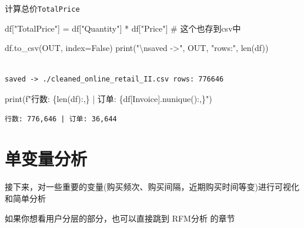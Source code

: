 \documentclass[
]{ctexart}
\newenvironment{Shaded}{\begin{snugshade}}{\end{snugshade}}
\newcommand{\BuiltInTok}[1]{\textcolor[rgb]{0.00,0.23,0.31}{#1}}
\newcommand{\CharTok}[1]{\textcolor[rgb]{0.13,0.47,0.30}{#1}}
\newcommand{\CommentTok}[1]{\textcolor[rgb]{0.37,0.37,0.37}{#1}}
\newcommand{\NormalTok}[1]{\textcolor[rgb]{0.00,0.23,0.31}{#1}}
\newcommand{\OperatorTok}[1]{\textcolor[rgb]{0.37,0.37,0.37}{#1}}
\newcommand{\SpecialCharTok}[1]{\textcolor[rgb]{0.37,0.37,0.37}{#1}}
\newcommand{\SpecialStringTok}[1]{\textcolor[rgb]{0.13,0.47,0.30}{#1}}
\newcommand{\StringTok}[1]{\textcolor[rgb]{0.13,0.47,0.30}{#1}}
\newcommand{\VariableTok}[1]{\textcolor[rgb]{0.07,0.07,0.07}{#1}}
\begin{document}
计算总价\texttt{TotalPrice}

\begin{Shaded}
\begin{Highlighting}[]
\NormalTok{df[}\StringTok{"TotalPrice"}\NormalTok{] }\OperatorTok{=}\NormalTok{ df[}\StringTok{"Quantity"}\NormalTok{] }\OperatorTok{*}\NormalTok{ df[}\StringTok{"Price"}\NormalTok{] }\CommentTok{\# 这个也存到csv中}
\end{Highlighting}
\end{Shaded}

\begin{Shaded}
\begin{Highlighting}[]
\NormalTok{df.to\_csv(OUT, index}\OperatorTok{=}\VariableTok{False}\NormalTok{)}
\BuiltInTok{print}\NormalTok{(}\StringTok{"}\CharTok{\textbackslash{}n}\StringTok{saved {-}\textgreater{}"}\NormalTok{, OUT, }\StringTok{"rows:"}\NormalTok{, }\BuiltInTok{len}\NormalTok{(df))}
\end{Highlighting}
\end{Shaded}

\begin{verbatim}

saved -> ./cleaned_online_retail_II.csv rows: 776646
\end{verbatim}

\begin{Shaded}
\begin{Highlighting}[]
\BuiltInTok{print}\NormalTok{(}\SpecialStringTok{f"行数: }\SpecialCharTok{\{}\BuiltInTok{len}\NormalTok{(df)}\SpecialCharTok{:,\}}\SpecialStringTok{ | 订单: }\SpecialCharTok{\{}\NormalTok{df[}\StringTok{\textquotesingle{}Invoice\textquotesingle{}}\NormalTok{]}\SpecialCharTok{.}\NormalTok{nunique()}\SpecialCharTok{:,\}}\SpecialStringTok{"}\NormalTok{)}
\end{Highlighting}
\end{Shaded}

\begin{verbatim}
行数: 776,646 | 订单: 36,644
\end{verbatim}

\section{单变量分析}\label{ux5355ux53d8ux91cfux5206ux6790}

接下来，对一些重要的变量(购买频次、购买间隔，近期购买时间等变)进行可视化和简单分析

如果你想看用户分层的部分，也可以直接跳到 RFM分析 的章节
\end{document}
